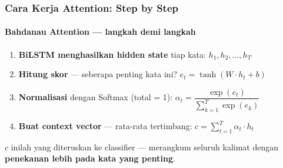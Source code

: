\documentclass[t,aspectratio=169,xcolor=dvipsnames]{beamer}
\begin{document}
\begin{frame}
    \frametitle{Cara Kerja Attention: Step by Step}
    \framesubtitle{Bahdanau Attention — langkah demi langkah}
    \small
    \begin{enumerate}\setlength{\itemsep}{0.05em}
        \item \textbf{BiLSTM menghasilkan hidden state} tiap kata: $h_1, h_2, \ldots, h_T$

        \item \textbf{Hitung skor} — seberapa penting kata ini?
        $\displaystyle e_t = \tanh(W \cdot h_t + b)$

        \item \textbf{Normalisasi} dengan Softmax (total = 1):
        $\displaystyle \alpha_t = \dfrac{\exp(e_t)}{\sum_{k=1}^{T} \exp(e_k)}$

        \item \textbf{Buat context vector} — rata-rata tertimbang:
        $\displaystyle c = \sum_{t=1}^{T} \alpha_t \cdot h_t$
    \end{enumerate}

    \vspace{0.2em}
    \begin{exampleblock}{}
        \footnotesize
        $c$ inilah yang diteruskan ke classifier — merangkum seluruh kalimat dengan \textbf{penekanan lebih pada kata yang penting}.
    \end{exampleblock}
\end{frame}
\end{document}
